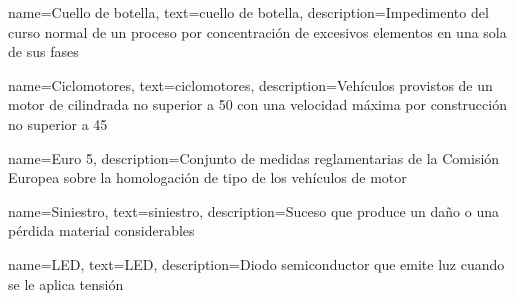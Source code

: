 {
        name=Cuello de botella,
        text=cuello de botella,
        description={Impedimento del curso normal de un proceso por concentración de excesivos elementos en una sola de sus fases}
}

{
        name=Ciclomotores,
        text=ciclomotores,
        description={Vehículos provistos de un motor de cilindrada no superior a 50  con una velocidad máxima por construcción no superior a 45 }
}

{
        name=Euro 5,
        description={Conjunto de medidas reglamentarias de la Comisión Europea sobre la homologación de tipo de los vehículos de motor}
}

{
        name=Siniestro,
        text=siniestro,
        description={Suceso que produce un daño o una pérdida material considerables}
}

{
        name=LED,
        text=LED,
        description={Diodo semiconductor que emite luz cuando se le aplica tensión}
}
